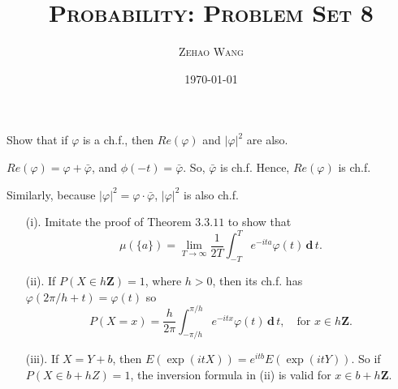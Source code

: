 \documentclass[en, normal, 12pt, black]{elegantnote}
\title{\textsc{Probability: Problem Set 8}}
\author{\textsc{Zehao Wang}}
\date{\today}
\newenvironment{exercise}[1]{\begin{tcolorbox}[colback=black!15, colframe=black!80, breakable, title=#1]}{\end{tcolorbox}}
\newenvironment{solution}{\begin{tcolorbox}[colback=white, colframe=black!50, breakable, title=Solution. ]\setlength{\parskip}{0.8em}}{\end{tcolorbox}}
\newcommand{\der}{\,\mathbf{d}\,}
\begin{document}
    \maketitle
    \begin{exercise}{3.3.1}
        Show that if $\varphi$ is a ch.f., then $Re(\varphi)$ and $|\varphi|^2$ are also. 
    \end{exercise}
    \begin{solution}
        $Re(\varphi)=\varphi+\bar{\varphi}$, and $\phi(-t)=\bar{\varphi}$. So, $\bar{\varphi}$ is ch.f. Hence, $Re(\varphi)$ is ch.f. 
        
        Similarly, because $|\varphi|^2=\varphi\cdot\bar{\varphi}$, $|\varphi|^2$ is also ch.f. 
    \end{solution}

    \begin{exercise}{3.3.2}
        \begin{itemize}
            \item[(i).] Imitate the proof of Theorem $3.3.11$ to show that
            \[
                \mu(\{a\})=\lim _{T \rightarrow \infty} \frac{1}{2 T} \int_{-T}^{T} e^{-i t a} \varphi(t) \der t. 
            \]
            \item[(ii).] If $P(X \in h \mathbf{Z})=1$, where $h>0$, then its ch.f. has $\varphi(2 \pi / h+t)=\varphi(t)$ so
            \[
                P(X=x)=\frac{h}{2 \pi} \int_{-\pi / h}^{\pi / h} e^{-i t x} \varphi(t) \der t, \quad\text{for } x \in h \mathbf{Z}. 
            \]
            \item[(iii).] If $X=Y+b$, then $E(\exp (i t X))=e^{i t b} E (\exp (i t Y))$. So if $P(X \in b+h Z)=1$, the inversion formula in (ii) is valid for $x \in b+h \mathbf{Z}$. 
        \end{itemize}
    \end{exercise}
\end{document}
